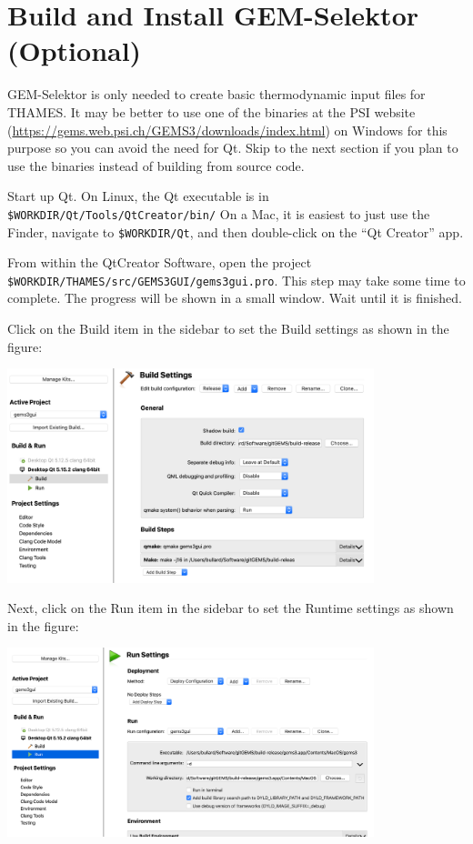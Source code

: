 \documentclass{article}
\begin{document}
\section{Build and Install GEM-Selektor (Optional)}
GEM-Selektor is only needed to create basic thermodynamic input files for
THAMES. It may be better to use one of the binaries at the PSI website
(\url{https://gems.web.psi.ch/GEMS3/downloads/index.html}) on Windows for this
purpose so you can avoid the need for Qt. Skip to the next section if you plan
to use the binaries instead of building from source code.

Start up Qt.  On Linux, the Qt executable is in \verb!$WORKDIR/Qt/Tools/QtCreator/bin/!
On a Mac, it is easiest to just use the Finder, navigate to \verb!$WORKDIR/Qt!, and then
double-click on the ``Qt Creator'' app.

From within the QtCreator Software, open the project \verb!$WORKDIR/THAMES/src/GEMS3GUI/gems3gui.pro!.
This step may take some time to complete.  The progress will be shown in a small window.  Wait
until it is finished.

Click on the Build item in the sidebar to set the Build settings as shown in the figure:

\begin{center}
    \includegraphics[width=0.8\textwidth]{Figures/Qt-build-settings.png}
\end{center}

Next, click on the Run item in the sidebar to set the Runtime settings as shown in the figure:

\begin{center}
    \includegraphics[width=0.8\textwidth]{Figures/Qt-run-settings.png}
\end{center}
\end{document}

